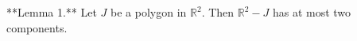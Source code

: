 **Lemma 1.** Let $J$ be a polygon in $\mathbb{R}^2$. Then $\mathbb{R}^2 - J$ has at most two components.
